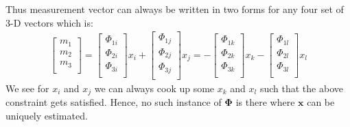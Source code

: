 \documentclass[12pt]{article}
\begin{document}
Thus measurement vector can always be written in two forms for any four set of 3-D vectors which is:
\begin{align*}
    \begin{bmatrix} 
    m_1 \\
    m_2 \\
    m_3 \\
    \end{bmatrix} =
    \begin{bmatrix} 
    \Phi_{1i} \\
    \Phi_{2i} \\
    \Phi_{3i} \\
    \end{bmatrix}x_i +
    \begin{bmatrix} 
    \Phi_{1j} \\
    \Phi_{2j} \\
    \Phi_{3j} \\
    \end{bmatrix}x_j = 
    -\begin{bmatrix} 
    \Phi_{1k} \\
    \Phi_{2k} \\
    \Phi_{3k} \\
    \end{bmatrix}x_k -
    \begin{bmatrix} 
    \Phi_{1l} \\
    \Phi_{2l} \\
    \Phi_{3l} \\
    \end{bmatrix}x_l 
\end{align*}
We see for $x_i$ and $x_j$ we can always cook up some $x_k$ and $x_l$ such that the above constraint gets satisfied. Hence, no such instance of $\boldsymbol{\Phi}$ is there where $\boldsymbol{x}$ can be uniquely estimated.
\end{document}
